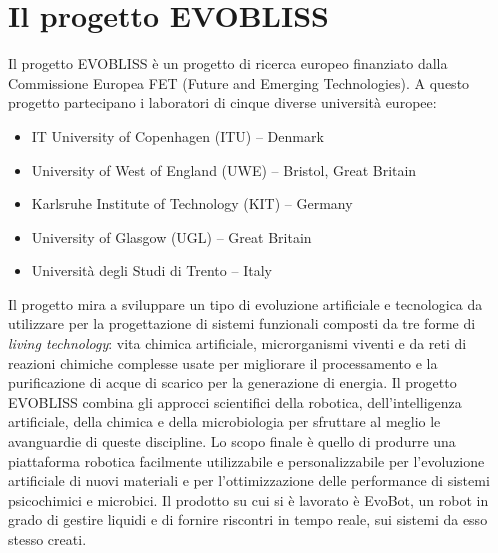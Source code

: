 \section{Il progetto EVOBLISS}
\label{sec:context}
Il progetto EVOBLISS  è un progetto di ricerca europeo finanziato dalla Commissione Europea FET (Future and Emerging Technologies). A questo progetto partecipano i laboratori di cinque diverse università europee:
\begin{itemize}
\item IT University of Copenhagen (ITU) – Denmark
\item University of West of England (UWE) – Bristol, Great Britain
\item Karlsruhe Institute of Technology (KIT) – Germany
\item University of Glasgow (UGL) – Great Britain
\item Università degli Studi di Trento – Italy
\end{itemize}
Il progetto mira a sviluppare un tipo di evoluzione artificiale e tecnologica da utilizzare per la progettazione di sistemi funzionali composti da tre forme di \emph{living technology}: vita chimica artificiale, microrganismi viventi e da reti di reazioni chimiche complesse usate per migliorare il processamento e la purificazione di acque di scarico per la generazione di energia.
Il progetto EVOBLISS combina gli approcci scientifici della robotica, dell'intelligenza artificiale, della chimica e della microbiologia per sfruttare al meglio le avanguardie di queste discipline. Lo scopo finale è quello di produrre una piattaforma robotica facilmente utilizzabile e personalizzabile per l'evoluzione artificiale di nuovi materiali e per l'ottimizzazione delle performance di sistemi psicochimici e microbici. Il prodotto su cui si è lavorato è EvoBot, un robot in grado di gestire liquidi e di fornire riscontri in tempo reale, sui sistemi da esso stesso creati.

